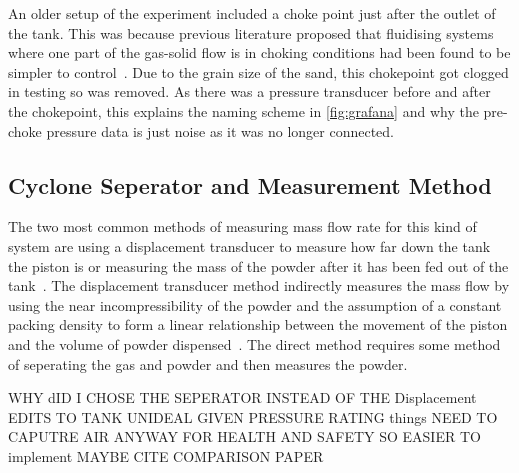 An older setup of the experiment included a choke point just after the outlet of the tank. This was because previous literature proposed that fluidising systems where one part of the gas-solid flow is in choking conditions had been found to be simpler to control~\cite{SUN201630}. Due to the grain size of the sand, this chokepoint got clogged in testing so was removed. As there was a pressure transducer before and after the chokepoint, this explains the naming scheme in \autoref{fig:grafana} and why the pre-choke pressure data is just noise as it was no longer connected.

\subsection{Cyclone Seperator and Measurement Method}
The two most common methods of measuring mass flow rate for this kind of system are using a displacement transducer to measure how far down the tank the piston is or measuring the mass of the powder after it has been fed out of the tank~\cite{SUN201630}\cite{LI2021712}\cite{Tang22}.
 The displacement transducer method indirectly measures the mass flow by using the near incompressibility of the powder and the assumption of a constant packing density to form a linear relationship between the movement of the piston and the volume of powder dispensed~\cite{SUN201630}. The direct method requires some method of seperating the gas and powder and then measures the powder. 

WHY dID I CHOSE THE SEPERATOR INSTEAD OF THE Displacement
EDITS TO TANK UNIDEAL GIVEN PRESSURE RATING things
NEED TO CAPUTRE AIR ANYWAY FOR HEALTH AND SAFETY SO EASIER TO implement
MAYBE CITE COMPARISON PAPER

